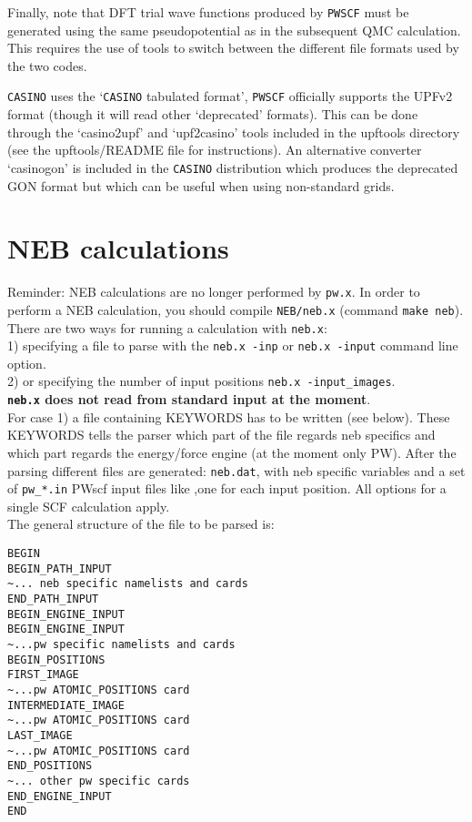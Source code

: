 \documentclass[12pt,a4paper]{article}
\def\pw.x{\texttt{pw.x}}
\def\neb.x{\texttt{neb.x}}
\begin{document}
Finally, note that DFT trial wave functions produced by \texttt{PWSCF}
must be generated using the same pseudopotential as in the subsequent QMC 
calculation. This requires the use of tools to switch between the different 
file formats used by the two codes.

\texttt{CASINO} uses the `\texttt{CASINO} tabulated format', \texttt{PWSCF} officially supports 
the UPFv2 format (though it will read other `deprecated' formats).
This can be done through the `casino2upf' and `upf2casino' tools included in the upftools directory (see the upftools/README file for instructions). An alternative converter `casinogon' is included in the \texttt{CASINO} distribution which produces the deprecated GON format but which can be useful when using non-standard grids.

\section{NEB calculations}

Reminder: NEB calculations are no longer performed by \pw.x.
In order to perform a NEB calculation, you should compile
\texttt{NEB/neb.x} (command \texttt{make neb}). \\

There are two ways for running a calculation with \neb.x: \\
1) specifying a file to parse with the \texttt{neb.x -inp} or 
\texttt{neb.x -input} command line option. \\
2) or specifying the number of input positions \texttt{neb.x -input\_images}. \\

{\bf \texttt{neb.x} does not read from standard input at the moment}. \\

For case 1) a file containing KEYWORDS has to be written (see below). 
These KEYWORDS tells the parser which part of the file regards neb specifics
and which part regards the energy/force engine (at the moment only PW).
After the parsing different files are generated: \texttt{neb.dat}, with
neb specific variables and a set of \texttt{pw\_*.in} PWscf input files like
,one for each input position. All options for a single SCF calculation apply. \\

The general structure of the file to be parsed is:

\begin{verbatim}
BEGIN
BEGIN_PATH_INPUT
~... neb specific namelists and cards
END_PATH_INPUT
BEGIN_ENGINE_INPUT
BEGIN_ENGINE_INPUT
~...pw specific namelists and cards
BEGIN_POSITIONS
FIRST_IMAGE
~...pw ATOMIC_POSITIONS card
INTERMEDIATE_IMAGE
~...pw ATOMIC_POSITIONS card
LAST_IMAGE
~...pw ATOMIC_POSITIONS card
END_POSITIONS
~... other pw specific cards
END_ENGINE_INPUT
END
\end{verbatim}
\end{document}
